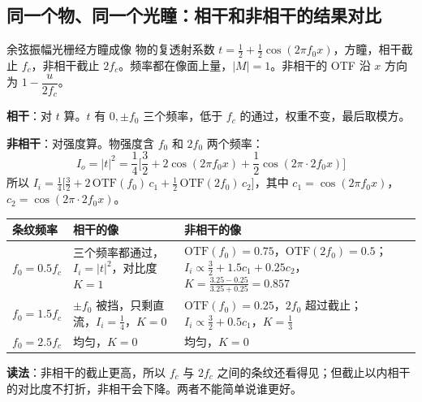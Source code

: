 \subsection*{同一个物、同一个光瞳：相干和非相干的结果对比}\label{sec:cohcompare}
\begin{exam}{余弦振幅光栅经方瞳成像}
物的复透射系数 $t=\frac12+\frac12\cos(2\pi f_0x)$，方瞳，相干截止 $f_c$，非相干截止 $2f_c$。频率都在像面上量，$|M|=1$。非相干的 OTF 沿 $x$ 方向为 $1-\dfrac{u}{2f_c}$。

\textbf{相干}：对 $t$ 算。$t$ 有 $0,\pm f_0$ 三个频率，低于 $f_c$ 的通过，权重不变，最后取模方。

\textbf{非相干}：对强度算。物强度含 $f_0$ 和 $2f_0$ 两个频率：
\[
I_o=|t|^2=\frac14\Big[\frac32+2\cos(2\pi f_0x)+\frac12\cos(2\pi\cdot2f_0x)\Big]
\]
所以 $I_i=\frac14\big[\frac32+2\,\mathrm{OTF}(f_0)\,c_1+\frac12\,\mathrm{OTF}(2f_0)\,c_2\big]$，其中 $c_1=\cos(2\pi f_0x)$，$c_2=\cos(2\pi\cdot2f_0x)$。

\begin{center}\small\renewcommand{\arraystretch}{1.4}
\begin{tabular}{@{}P{2.0cm}P{6.8cm}P{7.2cm}@{}}
\toprule
条纹频率 & 相干的像 & 非相干的像\\ \midrule
$f_0=0.5f_c$ & 三个频率都通过，$I_i=|t|^2$，对比度 $K=1$ & $\mathrm{OTF}(f_0)=0.75$，$\mathrm{OTF}(2f_0)=0.5$；$I_i\propto\frac32+1.5c_1+0.25c_2$，$K=\frac{3.25-0.25}{3.25+0.25}=0.857$\\
$f_0=1.5f_c$ & $\pm f_0$ 被挡，只剩直流，$I_i=\frac14$，$K=0$ & $\mathrm{OTF}(f_0)=0.25$，$2f_0$ 超过截止；$I_i\propto\frac32+0.5c_1$，$K=\frac13$\\
$f_0=2.5f_c$ & 均匀，$K=0$ & 均匀，$K=0$\\
\bottomrule
\end{tabular}
\end{center}
\textbf{读法}：非相干的截止更高，所以 $f_c$ 与 $2f_c$ 之间的条纹还看得见；但截止以内相干的对比度不打折，非相干会下降。两者不能简单说谁更好。
\end{exam}

